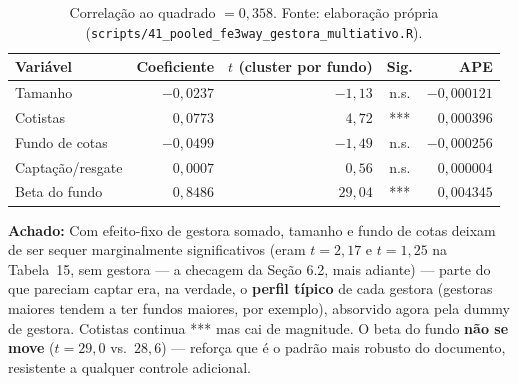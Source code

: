 \documentclass[11pt,a4paper]{article}
\newcommand{\aha}[1]{\par\vspace{4pt}\noindent\textbf{\color{vermelho}Achado:} #1\par\vspace{2pt}}
\begin{document}
\begin{table}[h]\centering\small
\caption{As 5 características, com efeito-fixo de ativo, mês \emph{e} gestora juntos.}
\begin{tabular}{@{}lrrcr@{}}
\toprule
Variável & Coeficiente & $t$ (cluster por fundo) & Sig. & APE \\
\midrule
Tamanho              & $-0{,}0237$ & $-1{,}13$ & n.s. & $-0{,}000121$ \\
Cotistas             & $0{,}0773$  & $4{,}72$  & *** & $0{,}000396$ \\
Fundo de cotas       & $-0{,}0499$ & $-1{,}49$ & n.s. & $-0{,}000256$ \\
Captação/resgate     & $0{,}0007$  & $0{,}56$  & n.s. & $0{,}000004$ \\
Beta do fundo        & $0{,}8486$  & $29{,}04$ & *** & $0{,}004345$ \\
\bottomrule
\end{tabular}
\caption*{\footnotesize Correlação ao quadrado $=0{,}358$. Fonte: elaboração própria
(\texttt{scripts/41\_pooled\_fe3way\_gestora\_multiativo.R}).}
\end{table}

\aha{Com efeito-fixo de gestora somado, tamanho e fundo de cotas deixam de ser sequer
marginalmente significativos (eram $t=2{,}17$ e $t=1{,}25$ na Tabela~15, sem gestora --- a
checagem da Seção 6.2, mais adiante) --- parte do que pareciam captar era, na verdade, o
\textbf{perfil típico} de cada gestora (gestoras maiores tendem a ter fundos maiores, por
exemplo), absorvido agora pela dummy de gestora. Cotistas continua *** mas cai de magnitude. O
beta do fundo \textbf{não se move} ($t=29{,}0$ vs.\ $28{,}6$) --- reforça que é o padrão mais
robusto do documento, resistente a qualquer controle adicional.}
\end{document}
